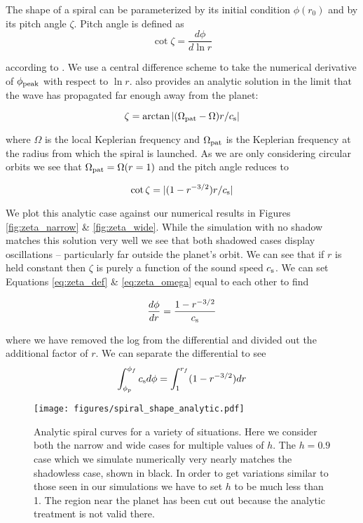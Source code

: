 \documentclass[twocolumn]{aastex631}
\begin{document}
The shape of a spiral can be parameterized by its initial condition $\phi(r_0)$ and by its pitch angle $\zeta$. Pitch angle
is defined as
\begin{equation}
    \cot \zeta = \frac{d\phi}{d \ln r}
    \label{eq:zeta_def}
\end{equation}

according to \citet{zhu2022}. We use a central difference scheme to take the numerical derivative of $\phi_{\rm peak}$ with respect to $\ln r$.
\citet{zhu2022} also provides an analytic solution in the limit that the wave has propagated far enough away from the planet:

\begin{equation}
    \zeta = \arctan |(\Omega_{\rm pat} - \Omega)r/c_{\rm s}|
\end{equation}

where $\Omega$ is the local Keplerian frequency and $\Omega_{\rm pat}$ is the Keplerian frequency at the
radius from which the spiral is launched. As we are only considering circular orbits we see that 
$\Omega_{\rm pat} = \Omega(r=1)$ and the pitch angle reduces to

\begin{equation}
    \cot \zeta = |(1-r^{-3/2}) r/c_{\rm s}|
    \label{eq:zeta_omega}
\end{equation}

We plot this analytic case against our numerical results in Figures \ref{fig:zeta_narrow} \& \ref{fig:zeta_wide}. While the simulation with
no shadow matches this solution very well we see that both shadowed cases display oscillations -- particularly far outside the planet's orbit.
We can see that if $r$ is held constant then $\zeta$ is purely a function of the sound speed $c_{\rm s}$. We can set
Equations \ref{eq:zeta_def} \& \ref{eq:zeta_omega} equal to each other to find

\begin{equation}
    \frac{d\phi}{d r} = \frac{1-r^{-3/2}}{c_{\rm s}}
\end{equation}

where we have removed the log from the differential and divided out the additional factor of $r$. We can separate the differential to see
\begin{equation}
    \int_{\phi_p}^{\phi_f} c_{\rm s} d \phi = \int_{1}^{r_f} (1-r^{-3/2}) d r
    \label{eq:analytic_shadow}
\end{equation}

\begin{figure}
    \centering
    \texttt{[image: figures/spiral\_shape\_analytic.pdf]}
    \caption{
        Analytic spiral curves for a variety of situations. Here we consider both the narrow and wide cases for multiple values of $h$.
        The $h=0.9$ case which we simulate numerically very nearly matches the shadowless case, shown in black. In order to get
        variations similar to those seen in our simulations we have to set $h$ to be much less than 1. The region near the planet
        has been cut out because the analytic treatment is not valid there.
    }
    \label{fig:analytic_spiral}
\end{figure}
\end{document}
